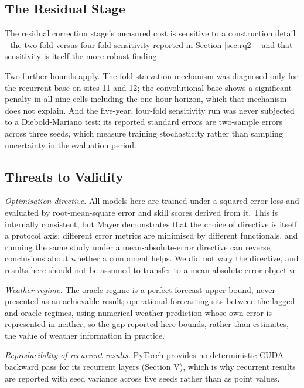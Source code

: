 \subsection{The Residual Stage}
\label{sec:limitations-residual-stage}

The residual correction stage's measured cost is sensitive to a
construction detail - the two-fold-versus-four-fold sensitivity
reported in Section \ref{sec:rq2} - and that sensitivity is itself the
more robust finding.

Two further bounds apply. The fold-starvation mechanism was diagnosed
only for the recurrent base on sites 11 and 12; the convolutional base
shows a significant penalty in all nine cells including the one-hour
horizon, which that mechanism does not explain. And the five-year,
four-fold sensitivity run was never subjected to a Diebold-Mariano test:
its reported standard errors are two-sample errors across three seeds,
which measure training stochasticity rather than sampling uncertainty in
the evaluation period.

\subsection{Threats to Validity}
\label{sec:threats-to-validity}

\textit{Optimisation directive.} All models here are trained under a
squared error loss and evaluated by root-mean-square error and skill
scores derived from it. This is internally consistent, but Mayer
\cite{mayer2022physmlhybrid} demonstrates that the choice of directive
is itself a protocol axis: different error metrics are minimised by
different functionals, and running the same study under a
mean-absolute-error directive can reverse conclusions about whether a
component helps. We did not vary the directive, and results here should
not be assumed to transfer to a mean-absolute-error objective.

\textit{Weather regime.} The oracle regime is a perfect-forecast upper
bound, never presented as an achievable result; operational forecasting
sits between the lagged and oracle regimes, using numerical weather
prediction whose own error is represented in neither, so the gap
reported here bounds, rather than estimates, the value of weather
information in practice.

\textit{Reproducibility of recurrent results.} PyTorch provides no
deterministic CUDA backward pass for its recurrent layers (Section V),
which is why recurrent results are reported with seed variance across
five seeds rather than as point values.

